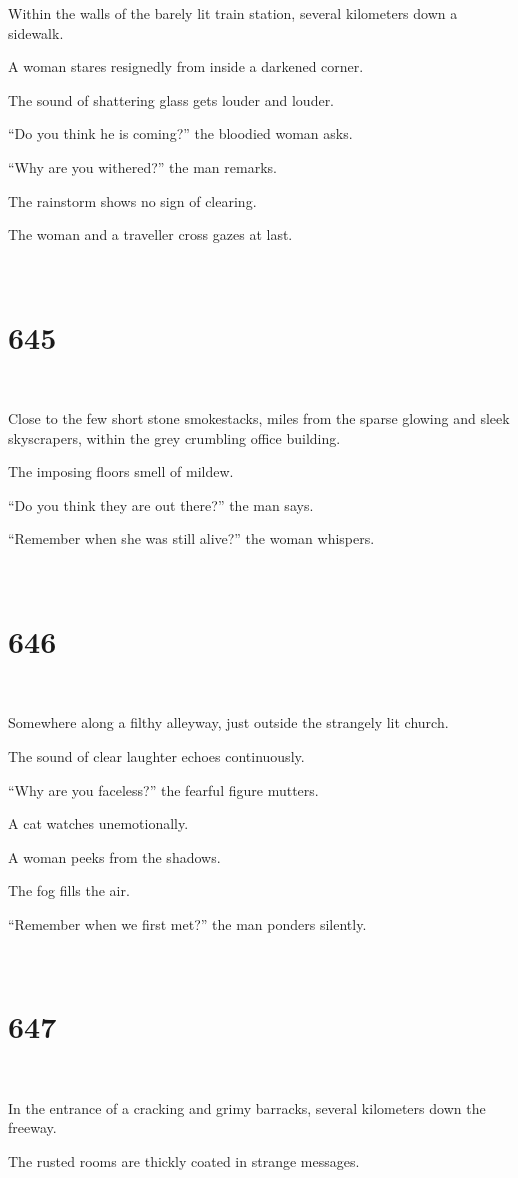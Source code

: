 \documentclass{report}
\begin{document}
Within the walls of the barely lit train station, several kilometers down a sidewalk.

A woman stares resignedly from inside a darkened corner.

The sound of shattering glass gets louder and louder.

``Do you think he is coming?'' the bloodied woman asks.

``Why are you withered?'' the man remarks.

The rainstorm shows no sign of clearing.

The woman and a traveller cross gazes at last.

~
\chapter*{645}
~

Close to the few short stone smokestacks, miles from the sparse glowing and sleek skyscrapers, within the grey crumbling office building.

The imposing floors smell of mildew.

``Do you think they are out there?'' the man says.

``Remember when she was still alive?'' the woman whispers.

~
\chapter*{646}
~

Somewhere along a filthy alleyway, just outside the strangely lit church.

The sound of clear laughter echoes continuously.

``Why are you faceless?'' the fearful figure mutters.

A cat watches unemotionally.

A woman peeks from the shadows.

The fog fills the air.

``Remember when we first met?'' the man ponders silently.

~
\chapter*{647}
~

In the entrance of a cracking and grimy barracks, several kilometers down the freeway.

The rusted rooms are thickly coated in strange messages.
\end{document}
